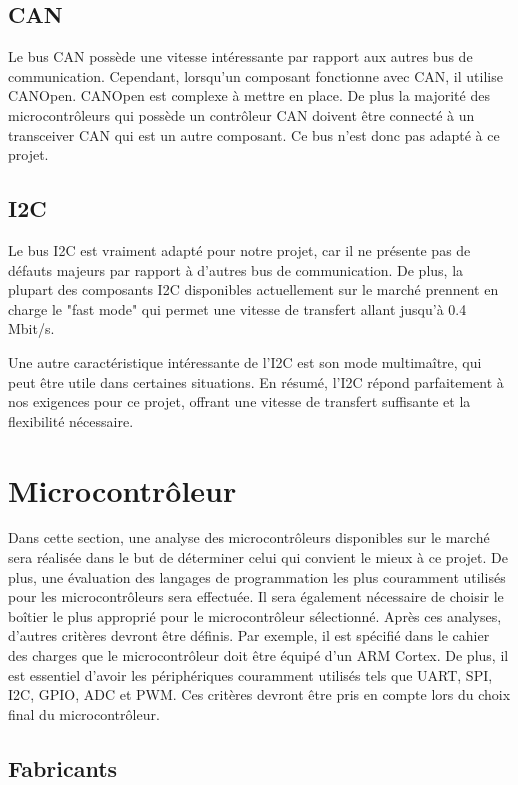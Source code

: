\subsection{CAN}

Le bus CAN possède une vitesse intéressante par rapport aux autres bus de communication. Cependant, lorsqu'un composant fonctionne avec CAN, il utilise CANOpen. CANOpen est complexe à mettre en place. De plus la majorité des microcontrôleurs qui possède un contrôleur CAN doivent être connecté à un transceiver CAN qui est un autre composant. Ce bus n'est donc pas adapté à ce projet.

\subsection{I2C}

Le bus I2C est vraiment adapté pour notre projet, car il ne présente pas de défauts majeurs par rapport à d'autres bus de communication.
De plus, la plupart des composants I2C disponibles actuellement sur le marché prennent en charge le "fast mode" qui permet une vitesse de transfert allant jusqu'à 0.4 Mbit/s.

Une autre caractéristique intéressante de l'I2C est son mode multimaître, qui peut être utile dans certaines situations.
En résumé, l'I2C répond parfaitement à nos exigences pour ce projet, offrant une vitesse de transfert suffisante et la flexibilité nécessaire.

\section{Microcontrôleur}

Dans cette section, une analyse des microcontrôleurs disponibles sur le marché sera réalisée dans le but de déterminer celui qui convient le mieux à ce projet.
De plus, une évaluation des langages de programmation les plus couramment utilisés pour les microcontrôleurs sera effectuée.
Il sera également nécessaire de choisir le boîtier le plus approprié pour le microcontrôleur sélectionné.
Après ces analyses, d'autres critères devront être définis.
Par exemple, il est spécifié dans le cahier des charges que le microcontrôleur doit être équipé d'un ARM Cortex.
De plus, il est essentiel d'avoir les périphériques couramment utilisés tels que UART, SPI, I2C, GPIO, ADC et PWM.
Ces critères devront être pris en compte lors du choix final du microcontrôleur.

\subsection{Fabricants}

